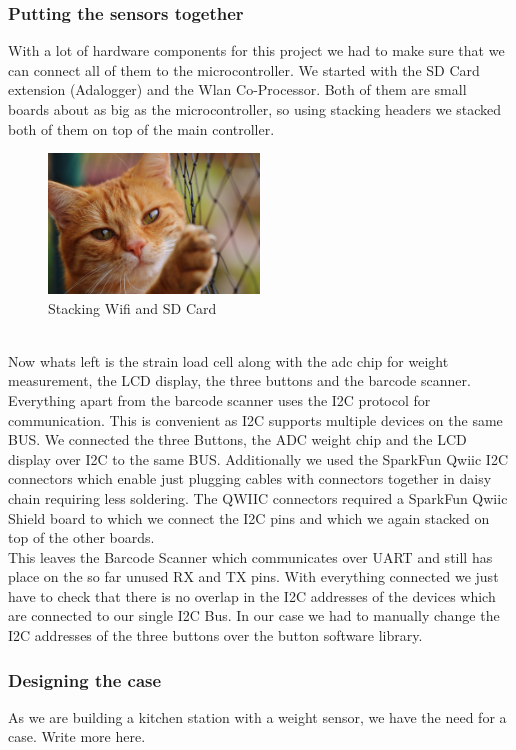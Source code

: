 \documentclass{article}
\begin{document}
\subsubsection{Putting the sensors together}
With a lot of hardware components for this project we had to make sure that we can connect all of them to the microcontroller.
We started with the SD Card extension (Adalogger) and the Wlan Co-Processor. Both of them are small boards about as big as the microcontroller, so using stacking headers we stacked both of them on top of the main controller.\\
\begin{figure}[h]
    \centering
    \includegraphics[width=0.5\textwidth]{cat.jpg}
    \caption{Stacking Wifi and SD Card}
    \label{fig:mesh1}
\end{figure}\\
Now whats left is the strain load cell along with the adc chip for weight measurement, the LCD display, the three buttons and the barcode scanner. 
Everything apart from the barcode scanner uses the I2C protocol for communication. This is convenient as I2C supports multiple devices on the same BUS.
We connected the three Buttons, the ADC weight chip and the LCD display over I2C to the same BUS. Additionally we used the SparkFun Qwiic I2C connectors which enable just plugging cables with
connectors together in daisy chain requiring less soldering. The QWIIC connectors required a SparkFun Qwiic Shield board to which we connect the I2C pins and which we again stacked on top of the other boards.\\
This leaves the Barcode Scanner which communicates over UART and still has place on the so far unused RX and TX pins.
With everything connected we just have to check that there is no overlap in the I2C addresses of the devices which are connected to our single I2C Bus.
In our case we had to manually change the I2C addresses of the three buttons over the button software library.
\subsubsection{Designing the case}
As we are building a kitchen station with a weight sensor, we have the need for a case.
Write more here.
\end{document}
